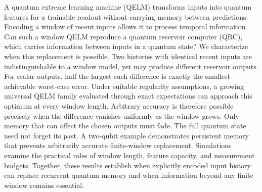 A quantum extreme learning machine (QELM) transforms inputs into quantum
features for a trainable readout without carrying memory between predictions.
Encoding a window of recent inputs allows it to process temporal information.
Can such a window QELM reproduce a quantum reservoir computer (QRC), which
carries information between inputs in a quantum state?
We characterize when this replacement is possible. Two histories with
identical recent inputs are indistinguishable to a window model, yet may
produce different reservoir outputs. For scalar outputs, half the largest
such difference is exactly the smallest achievable worst-case error. Under
suitable regularity assumptions, a growing universal QELM family evaluated
through exact expectations can approach this optimum at every window length.
Arbitrary accuracy is therefore possible precisely when the difference
vanishes uniformly as the window grows. Only
memory that can affect the chosen outputs must fade. The full quantum state
need not forget its past. A two-qubit example demonstrates persistent memory
that prevents arbitrarily accurate finite-window replacement. Simulations
examine the practical roles of window length, feature capacity, and
measurement budgets. Together, these results establish when explicitly
encoded input history can replace recurrent quantum memory and when
information beyond any finite window remains essential.
